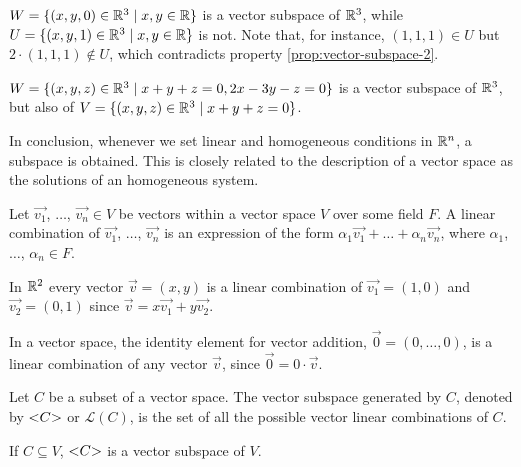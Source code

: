 \begin{example}
    $W = \{\left( x, y, 0 \right)\in \mathbb{R}^3\; | \; x, y\in\mathbb{R}\} $ is a vector subspace of $\mathbb{R}^3$, while $U = \{\left( x, y, 1 \right) \in\mathbb{R}^3\; | \; x, y\in\mathbb{R}\} $ is not. Note that, for instance, $\left( 1, 1, 1 \right)\in U$ but
    $2\cdot\left( 1, 1, 1 \right) \not\in U$, which contradicts property \ref{prop:vector-subspace-2}.
\end{example}

\begin{example}
    $W = \{\left( x, y, z \right) \in\mathbb{R}^3\; | \; x + y + z = 0, 2x - 3y - z = 0\} $ is a vector subspace of $\mathbb{R}^3$,
    but also of $V = \{\left( x, y, z \right) \in\mathbb{R}^3\; | \; x + y + z = 0\} $.
\end{example}

In conclusion, whenever we set linear and homogeneous conditions in $\mathbb{R}^n$, a subspace is obtained. This is
closely related to the description of a vector space as the solutions of an homogeneous system.

\begin{defi}
    Let $\vec{v_1}$, $\ldots$, $\vec{v_n}\in V$ be vectors within a vector space $V$ over some field $F$.
    A linear combination of $\vec{v_1}$, $\ldots$, $\vec{v_n}$ is an expression of the form $\alpha_1
    \vec{v_1} + \ldots + \alpha_n\vec{v_n}$, where  $\alpha_1$, $\ldots$, $\alpha_n\in F$.
\end{defi}

\begin{example}
    In $\mathbb{R}^2$ every vector $\vec{v} = \left(x, y\right)$ is a linear combination of $\vec{v_1} =
    \left( 1, 0 \right) $ and $\vec{v_2} = \left( 0, 1 \right) $ since $\vec{v} = x\vec{v_1} + y\vec{v_2}$.
\end{example}

\begin{prop}
    In a vector space, the identity element for vector addition, $\vec{0} = \left( 0, \ldots, 0 \right) $, is
    a linear combination of any vector $\vec{v}$, since $\vec{0} = 0\cdot\vec{v}$.
\end{prop}

\begin{defi}
    Let $C$ be a subset of a vector space. The vector subspace generated by $C$, denoted by $\mathopen{<} C \mathclose{>}$ or
    $\mathcal{L}\left( C \right) $, is the set of all the possible vector linear combinations of $C$.
\end{defi}

\begin{prop}
    If $C\subseteq V$, $\mathopen{<} C \mathclose{>}$ is a vector subspace of $V$.
\end{prop}

